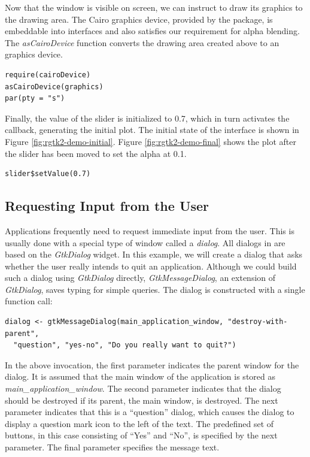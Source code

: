 \documentclass[article]{jss}
\begin{document}
Now that the window is visible on screen, we can instruct  to draw
its graphics to the drawing area. The Cairo graphics device, provided by the
 package, is embeddable
into  interfaces and also satisfies our requirement for alpha
blending. The \emph{asCairoDevice} function
converts the drawing area created above to an  graphics device. 
\begin{verbatim}
require(cairoDevice)
asCairoDevice(graphics)
par(pty = "s")
\end{verbatim}

Finally, the value of the slider is initialized to 0.7, which in turn
activates the callback, generating the initial plot. The initial state
of the interface is shown in Figure \ref{fig:rgtk2-demo-initial}.
Figure \ref{fig:rgtk2-demo-final} shows the plot after the slider has been
moved to set the alpha at 0.1.
\begin{verbatim}
slider$setValue(0.7)
\end{verbatim}

\subsection{Requesting Input from the User}\label{sec:dialog-example}

Applications frequently need to request immediate input from the user. This is
usually done with a special type of window called a \emph{dialog}. All dialogs
in  are based on the \emph{GtkDialog} widget. In this example,
we will create a dialog that asks whether the user really intends
to quit an application. Although we could build such a dialog using \emph{GtkDialog}
directly, \emph{GtkMessageDialog}, an extension of \emph{GtkDialog}, saves 
typing for simple queries. The dialog is constructed with a single function call:
\begin{verbatim}
dialog <- gtkMessageDialog(main_application_window, "destroy-with-parent", 
  "question", "yes-no", "Do you really want to quit?")
\end{verbatim}
In the above invocation, the first parameter indicates the parent window for
the dialog. It is assumed that the main window of the application is stored 
as \emph{main\_application\_window}. The second parameter indicates that
the dialog should be destroyed if its parent, the main window, is destroyed.
The next parameter indicates that this is a ``question'' dialog, which causes
the dialog to display a question mark icon to the left of the text. The 
predefined set of buttons, in this case consisting of ``Yes'' and ``No'', 
is specified by the next parameter. The final parameter specifies the message text.
\end{document}
